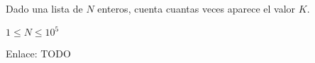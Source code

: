Dado una lista de \(N\) enteros, cuenta cuantas veces aparece el valor \(K\). 

\begin{plimits}
	\item \( 1\leq N\leq 10^5 \)
\end{plimits}

Enlace: TODO